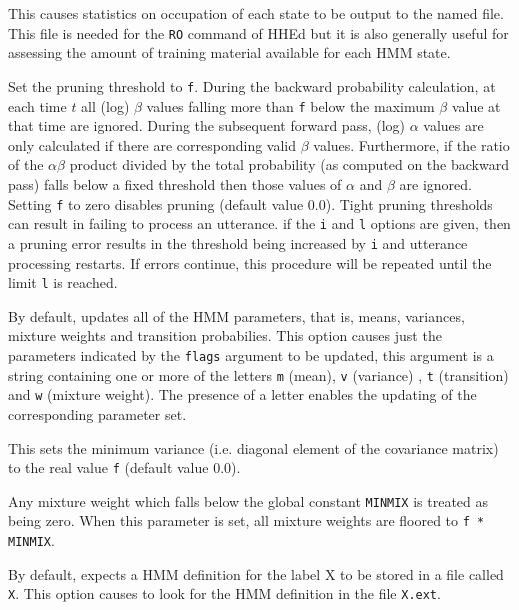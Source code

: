 \begin{optlist}
   This causes statistics on occupation of each
      state to be output to the named file.  This file
      is needed for the {\tt RO} command of HHEd but it is also
      generally useful for assessing the amount of training material
      available for each HMM state.
      
   Set the pruning threshold to {\tt f}.  During the 
      backward probability calculation, at
      each time $t$ 
      all (log) $\beta$ values falling more than {\tt f} below the
      maximum $\beta$ value at that time are ignored.  During the
      subsequent forward pass, (log) $\alpha$ values are only
      calculated if there are corresponding valid $\beta$ values.
      Furthermore, if the ratio of the $ \alpha \beta $ product divided
      by the total probability (as computed on the backward pass)
      falls below a fixed threshold then those values of $\alpha$
      and $\beta$ are ignored. Setting {\tt f} to zero disables
      pruning  (default value 0.0).  Tight pruning thresholds can
       result in  failing to process an utterance.
      if the {\tt i} and {\tt l} options are given, then a pruning
      error results in the threshold being increased by {\tt i} and
      utterance processing restarts.  If errors continue, this procedure will 
      be repeated until the limit {\tt l} is reached.
      
   By default,  updates all of the HMM parameters,
      that is, means, variances, mixture weights and 
      transition probabilies. This 
      option causes just the parameters indicated by the {\tt flags}
      argument to be updated, this argument is a string containing one
      or more of the letters {\tt m} (mean), {\tt v} (variance) ,
      {\tt t} (transition) and {\tt w} (mixture weight).  The 
      presence of a letter enables
      the updating of the corresponding parameter set.

    This sets the minimum variance (i.e. diagonal element of
      the covariance matrix) to the real value {\tt f} (default value
      0.0).

    Any mixture weight which falls below the global
            constant {\tt MINMIX} is treated as being zero.
      When this parameter is  set,  all mixture weights  are floored
      to {\tt f * MINMIX}.
      
    By default,  expects a HMM definition for 
      the label X to be stored in a file called {\tt X}.  This
      option causes  to look for the HMM definition in the
      file {\tt X.ext}.

\stdoptB
\stdoptF
\stdoptG
\stdoptH
\stdoptI
\stdoptL
\stdoptM
\stdoptX

\end{optlist}

